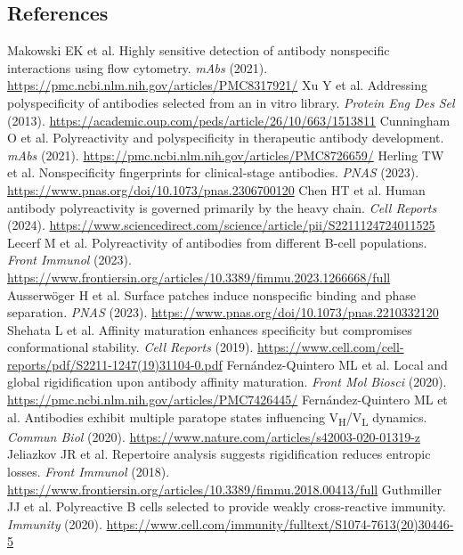 \subsection*{References}
\begin{small}
\begin{thebibliography}{99}
 Makowski EK et al. Highly sensitive detection of antibody nonspecific interactions using flow cytometry. \emph{mAbs} (2021). \url{https://pmc.ncbi.nlm.nih.gov/articles/PMC8317921/}
 Xu Y et al. Addressing polyspecificity of antibodies selected from an in vitro library. \emph{Protein Eng Des Sel} (2013). \url{https://academic.oup.com/peds/article/26/10/663/1513811}
 Cunningham O et al. Polyreactivity and polyspecificity in therapeutic antibody development. \emph{mAbs} (2021). \url{https://pmc.ncbi.nlm.nih.gov/articles/PMC8726659/}
 Herling TW et al. Nonspecificity fingerprints for clinical-stage antibodies. \emph{PNAS} (2023). \url{https://www.pnas.org/doi/10.1073/pnas.2306700120}
 Chen HT et al. Human antibody polyreactivity is governed primarily by the heavy chain. \emph{Cell Reports} (2024). \url{https://www.sciencedirect.com/science/article/pii/S2211124724011525}
 Lecerf M et al. Polyreactivity of antibodies from different B-cell populations. \emph{Front Immunol} (2023). \url{https://www.frontiersin.org/articles/10.3389/fimmu.2023.1266668/full}
 Ausserwöger H et al. Surface patches induce nonspecific binding and phase separation. \emph{PNAS} (2023). \url{https://www.pnas.org/doi/10.1073/pnas.2210332120}
 Shehata L et al. Affinity maturation enhances specificity but compromises conformational stability. \emph{Cell Reports} (2019). \url{https://www.cell.com/cell-reports/pdf/S2211-1247(19)31104-0.pdf}
 Fernández-Quintero ML et al. Local and global rigidification upon antibody affinity maturation. \emph{Front Mol Biosci} (2020). \url{https://pmc.ncbi.nlm.nih.gov/articles/PMC7426445/}
 Fernández-Quintero ML et al. Antibodies exhibit multiple paratope states influencing V\textsubscript{H}/V\textsubscript{L} dynamics. \emph{Commun Biol} (2020). \url{https://www.nature.com/articles/s42003-020-01319-z}
 Jeliazkov JR et al. Repertoire analysis suggests rigidification reduces entropic losses. \emph{Front Immunol} (2018). \url{https://www.frontiersin.org/articles/10.3389/fimmu.2018.00413/full}
 Guthmiller JJ et al. Polyreactive B cells selected to provide weakly cross-reactive immunity. \emph{Immunity} (2020). \url{https://www.cell.com/immunity/fulltext/S1074-7613(20)30446-5}

\end{thebibliography}
\end{small}
